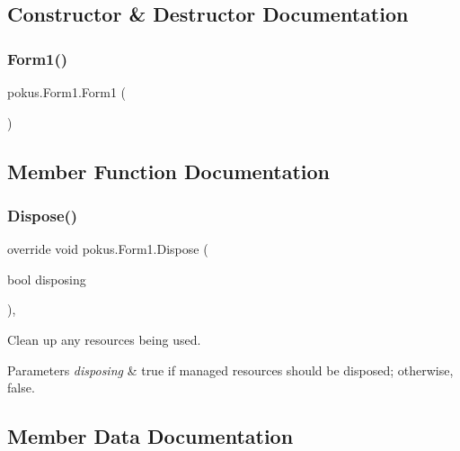 \subsection{Constructor \& Destructor Documentation}
\mbox{\label{classpokus_1_1Form1_ab64d54a396652470204211a4be1e404a}} 
\subsubsection{\texorpdfstring{Form1()}{Form1()}}
{\footnotesize\ttfamily pokus.\+Form1.\+Form1 (\begin{DoxyParamCaption}{ }\end{DoxyParamCaption})\hspace{0.3cm}{\ttfamily [inline]}}



\subsection{Member Function Documentation}
\mbox{\label{classpokus_1_1Form1_a24b23515810a6e52f80e600649e7f5a3}} 
\subsubsection{\texorpdfstring{Dispose()}{Dispose()}}
{\footnotesize\ttfamily override void pokus.\+Form1.\+Dispose (\begin{DoxyParamCaption}\item[{bool}]{disposing }\end{DoxyParamCaption})\hspace{0.3cm}{\ttfamily [inline]}, {\ttfamily [protected]}}



Clean up any resources being used. 


\begin{DoxyParams}{Parameters}
{\em disposing} & true if managed resources should be disposed; otherwise, false.\\
\hline
\end{DoxyParams}


\subsection{Member Data Documentation}
\mbox{\label{classpokus_1_1Form1_adb3eefca0a1ebdaad882b13e3f1f5ff3}} 
